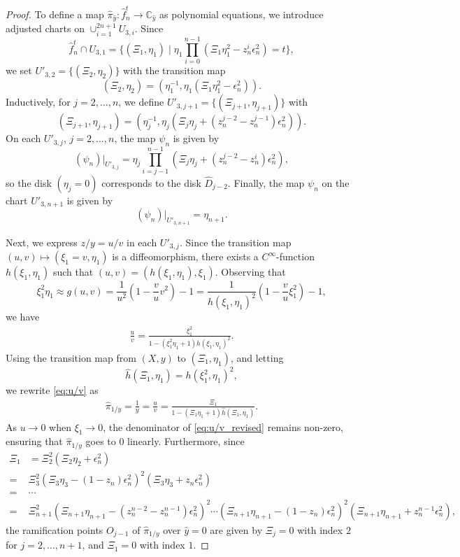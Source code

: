 \documentclass[10pt,a4paper,reqno]{amsart}
\theoremstyle{definition}
\numberwithin{equation}{section}
\numberwithin{figure}{section}
\newcommand{\C}{\mathbb{C}}
\newcommand{\ep}{\epsilon}
\newcommand{\arrowr}{\rightarrow}
\begin{document}
\begin{proof}
To define a map $\hat{\pi}_{\hat{y}}:\hat{f}_n^t \arrowr \C_{\hat{y}}$ as polynomial equations, 
we introduce adjusted charts on $\cup_{i=1}^{2n+1} U_{3,i}$.
Since
\[\hat{f}_n^t\cap U_{3,1}=\{(\Xi_1, \eta_1)\mid \eta_1 \prod_{i=0}^{n-1} (\Xi_1 \eta_1^2 -z_n^i {\ep_n^{2}})=t  \},\]
we set $U'_{3,2}=\{(\Xi_2, \eta_2)\}$ with the transition map \[(\Xi_2, \eta_2)=(\eta_1^{-1}, \eta_1(\Xi_1 \eta_1^2 -{\ep_n^{2}})).\]
Inductively, for $j=2,\dots, n$, we define $U'_{3,j+1}=\{(\Xi_{j+1}, \eta_{j+1})\}$ with
\[(\Xi_{j+1}, \eta_{j+1})=(\eta_j^{-1}, \eta_j(\Xi_j \eta_j +(z_n^{j-2}-z_n^{j-1}){\ep_n^{2}})).\]
On each $U'_{3,j}$, $j=2, \dots, n$, the map $\psi_n$ is given by
\[(\psi_n)|_{U'_{3,j}}=\eta_j \prod_{i=j-1}^{n-1} (\Xi_j \eta_j+(z_n^{j-2}-z_n^{i}){\ep_n^{2}}),\]
so the disk $(\eta_j=0)$ corresponds to the disk $\hat{D}_{j-2}$.
Finally, the map $\psi_n$ on the chart $U'_{3,n+1}$ is given by
\[(\psi_n)|_{U'_{3,n+1}}=\eta_{n+1}.\]

Next, we express $z/y=u/v$ in each $U'_{3,j}$.
Since the transition map $(u,v)\mapsto (\xi_1=v, \eta_1)$ is a diffeomorphism, 
there exists a $C^\infty$-function $h(\xi_1, \eta_1)$ such that $(u,v)=(h(\xi_1, \eta_1), \xi_1)$.
Observing that \[\xi_1^2 \eta_1 \approx g(u,v)=\frac{1}{u^2} \left(1-\frac{v}{u}v^2 \right)-1=\frac{1}{h(\xi_1, \eta_1)^2}\left(1-\frac{v}{u}\xi_1^2\right)-1, \]
we have
\begin{align} \label{eq:u/v}
\frac{u}{v}=\frac{\xi_1^2}{1-(\xi_1^2 \eta_1+1)h(\xi_1, \eta_1)^2}.
\end{align}
Using the transition map from $(X, y)$ to $(\Xi_1, \eta_1)$, and letting \[\hat{h}(\Xi_1, \eta_1)={h}(\xi_1^2, \eta_1)^2,\]
we rewrite \eqref{eq:u/v} as
\begin{align} \label{eq:u/v_revised}
\hat{\pi}_{1/y}=\frac{1}{y}=\frac{u}{v}=\frac{\Xi_1}{1-(\Xi_1 \eta_1+1)\hat{h}(\Xi_1, \eta_1)}.
\end{align}
As $u \arrowr 0$ when $\xi_1 \arrowr 0$, the denominator of \eqref{eq:u/v_revised} remains non-zero, 
ensuring that $\hat{\pi}_{1/y}$ goes to $0$ linearly.
Furthermore, since
\begin{align*}
\Xi_1&= \Xi_2^2( \Xi_2 \eta_2 +{\ep_n^{2}}) \\
=&\Xi_3^2 (\Xi_3 \eta_3 - (1-z_n){\ep_n^{2}})^2(\Xi_3 \eta_3 +z_n {\ep_n^{2}}) \\
=&\cdots \\
=& \Xi_{n+1}^2 (\Xi_{n+1}\eta_{n+1}-(z_n^{n-2}-z_n^{n-1}){\ep_n^{2}})^2  \cdots  (\Xi_{n+1}\eta_{n+1}-(1-z_n)\ep_n^2)^2 (\Xi_{n+1}\eta_{n+1}+z_n^{n-1}{\ep_n^{2}}),
\end{align*}
the ramification points $O_{j-1}$ of $\hat{\pi}_{1/y}$ over $\hat{y}=0$ are given by $\Xi_{j}=0$ with index $2$ for $j=2,\dots, n+1$, and $\Xi_1=0$ with index $1$.
\end{proof}
\end{document}
